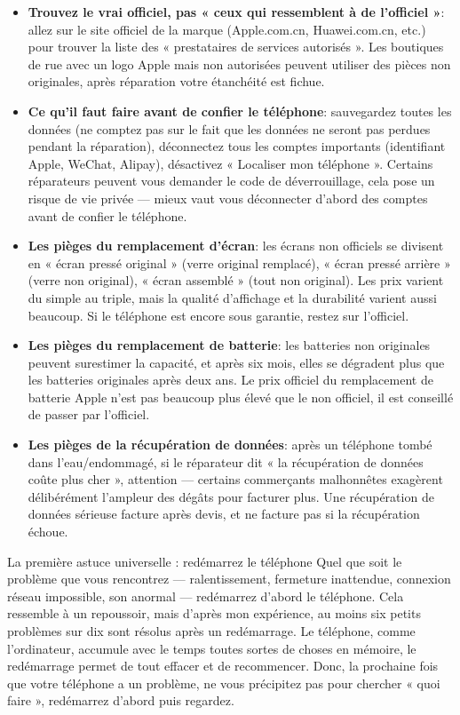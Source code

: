 \begin{itemize}
  \item \textbf{Trouvez le vrai officiel, pas « ceux qui ressemblent à de l'officiel »}: allez sur le site officiel de la marque (Apple.com.cn, Huawei.com.cn, etc.) pour trouver la liste des « prestataires de services autorisés ». Les boutiques de rue avec un logo Apple mais non autorisées peuvent utiliser des pièces non originales, après réparation votre étanchéité est fichue.
  \item \textbf{Ce qu'il faut faire avant de confier le téléphone}: sauvegardez toutes les données (ne comptez pas sur le fait que les données ne seront pas perdues pendant la réparation), déconnectez tous les comptes importants (identifiant Apple, WeChat, Alipay), désactivez « Localiser mon téléphone ». Certains réparateurs peuvent vous demander le code de déverrouillage, cela pose un risque de vie privée — mieux vaut vous déconnecter d'abord des comptes avant de confier le téléphone.
  \item \textbf{Les pièges du remplacement d'écran}: les écrans non officiels se divisent en « écran pressé original » (verre original remplacé), « écran pressé arrière » (verre non original), « écran assemblé » (tout non original). Les prix varient du simple au triple, mais la qualité d'affichage et la durabilité varient aussi beaucoup. Si le téléphone est encore sous garantie, restez sur l'officiel.
  \item \textbf{Les pièges du remplacement de batterie}: les batteries non originales peuvent surestimer la capacité, et après six mois, elles se dégradent plus que les batteries originales après deux ans. Le prix officiel du remplacement de batterie Apple n'est pas beaucoup plus élevé que le non officiel, il est conseillé de passer par l'officiel.
  \item \textbf{Les pièges de la récupération de données}: après un téléphone tombé dans l'eau/endommagé, si le réparateur dit « la récupération de données coûte plus cher », attention — certains commerçants malhonnêtes exagèrent délibérément l'ampleur des dégâts pour facturer plus. Une récupération de données sérieuse facture après devis, et ne facture pas si la récupération échoue.
\end{itemize}

\begin{tcbwarn}{La première astuce universelle : redémarrez le téléphone}
Quel que soit le problème que vous rencontrez — ralentissement, fermeture inattendue, connexion réseau impossible, son anormal — redémarrez d'abord le téléphone. Cela ressemble à un repoussoir, mais d'après mon expérience, au moins six petits problèmes sur dix sont résolus après un redémarrage. Le téléphone, comme l'ordinateur, accumule avec le temps toutes sortes de choses en mémoire, le redémarrage permet de tout effacer et de recommencer. Donc, la prochaine fois que votre téléphone a un problème, ne vous précipitez pas pour chercher « quoi faire », redémarrez d'abord puis regardez.

\end{tcbwarn}

